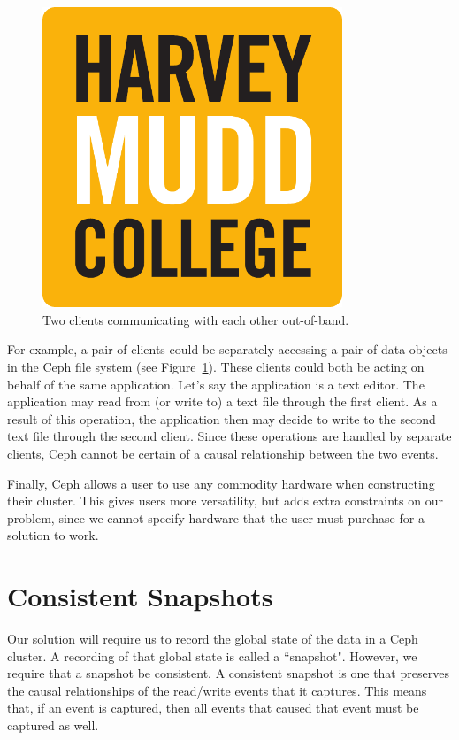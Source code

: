\begin{figure}[h]
  \centering
  \caption{Two clients communicating with each other out-of-band.} 
  \label{fig:out-of-band}
  \includegraphics[width=0.8\textwidth]{hmclogo.pdf}%
\end{figure}

For example, a pair of clients could be separately accessing a pair of data 
objects in the Ceph file system (see Figure~\ref{fig:out-of-band}). These clients could both be acting on behalf 
of the same application. Let's say the application is a text editor. The 
application may read from (or write to) a text file through the first client. 
As a result of this operation, the application then may decide to write to the 
second text file through the second client. Since these operations are handled 
by separate clients, Ceph cannot be certain of a causal relationship between 
the two events. 

Finally, Ceph allows a user to use any commodity hardware when constructing 
their cluster. This gives users more versatility, but adds extra constraints 
on our problem, since we cannot specify hardware that the user must purchase 
for a solution to work.

\section{Consistent Snapshots}

Our solution will require us to record the global state of the data in a Ceph 
cluster. A recording of that global state is called a ``snapshot". However, we 
require that a snapshot be consistent. A consistent snapshot is one that 
preserves the causal relationships of the read/write events that it captures.
This means that, if an event is captured, then all events that caused that 
event must be captured as well. 

